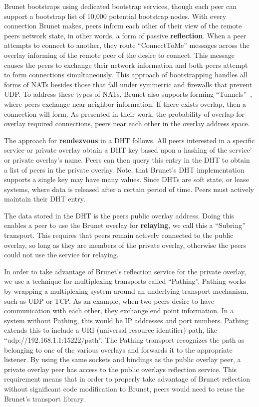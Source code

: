 \documentclass[conference]{IEEEtran}
\begin{document}
Brunet bootstraps using dedicated bootstrap services, though each peer can
support a bootstrap list of 10,000 potential bootstrap nodes.  With every
connection Brunet makes, peers inform each other of their view of the remote
peers network state, in other words, a form of passive \textbf{reflection}.
When a peer attempts to connect to another, they route ``ConnectToMe'' messages
across the overlay informing of the remote peer of the desire to connect.  This
message causes the peers to exchange their network information and both peers
attempt to form connections simultaneously.  This approach of bootstrapping
handles all forms of NATs besides those that fall under symmetric and firewalls
that prevent UDP.  To address these types of NATs, Brunet also supports forming
``Tunnels''~\cite{hpdc08_0}, where peers exchange near neighbor information.
If there exists overlap, then a connection will form.  As presented in their
work, the probability of overlap for overlay required connections, peers near
each other in the overlay address space.

The approach for \textbf{rendezvous} in a DHT follows.  All peers interested in
a specific service or private overlay obtain a DHT key based upon a hashing of
the service' or private overlay's name.  Peers can then query this entry in the
DHT to obtain a list of peers in the private overlay.  Note, that Brunet's DHT
implementation supports a single key may have many values.  Since DHTs are soft
state, or lease systems, where data is released after a certain period of time.
Peers must actively maintain their DHT entry.  

The data stored in the DHT is the peers public overlay address.  Doing this
enables a peer to use the Brunet overlay for \textbf{relaying}, we call this a
``Subring'' transport.  This requires that peers remain actively connected to
the public overlay, so long as they are members of the private overlay,
otherwise the peers could not use the service for relaying.

In order to take advantage of Brunet's reflection service for the private
overlay, we use a technique for multiplexing transports called ``Pathing''.
Pathing works by wrapping a multiplexing system around an underlying transport
mechanism, such as UDP or TCP.  As an example, when two peers desire to have
communication with each other, they exchange end point information.  In a
system without Pathing, this would be IP addresses and port numbers.  Pathing
extends this to include a URI (universal resource identifier) path, like
``udp://192.168.1.1:15222/path''.  The Pathing transport recognizes the path as
belonging to one of the various overlays and forwards it to the appropriate
listener.  By using the same sockets and bindings as the public overlay peer, a
private overlay peer has access to the public overlays reflection service.
This requirement means that in order to properly take advantage of Brunet
reflection without significant code modification to Brunet, peers would need to
reuse the Brunet's transport library.
\end{document}
